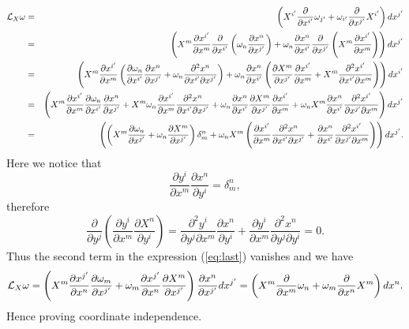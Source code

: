 \begin{eqnarray}
{\mathcal{L}}_{X} \omega &=& \left( X^{i'} \frac{\partial}{\partial x^{i'}}\omega_{j'} + \omega_{i'} \frac{\partial}{\partial x^{j'}}{X}^{i'} \right)dx^{j'} \nonumber \\
&=&\left(X^m\frac{\partial x^{i'}}{\partial x^m} \frac{\partial}{\partial x^{i'}}\left(\omega_n\frac{\partial x^n}{\partial x^{j'}}\right) + \omega_n\frac{\partial x^n}{\partial x^{i'}}\frac{\partial}{\partial x^{j'}}\left(X^m \frac{\partial x^{i'}}{\partial x^m}\right)\right)d x^{j'} \nonumber \\
&=& \left(X^m\frac{\partial x^{i'}}{\partial x^m}\left( \frac{\partial\omega_n}{\partial x^{i'}}\frac{\partial x^n}{\partial x^{j'}}+\omega_n\frac{\partial^2 x^n}{\partial x^{i'}\partial x^{j'}}\right) + \omega_n \frac{\partial x^n}{\partial x^{i'}}\left(\frac{\partial X^m}{\partial x^{j'}}\frac{\partial x^{i'}}{\partial x^m}+X^m\frac{\partial^2 x^{i'}}{\partial x^{i'} \partial x^m} \right) \right)d x^{i'} \nonumber \\
&=&\left(X^m\frac{\partial x^{i'}}{\partial x^m}\frac{\partial\omega_n}{\partial x^{i'}}\frac{\partial x^n}{\partial x^{j'}}+X^m\omega_n\frac{\partial x^{i'}}{\partial x^m}\frac{\partial^2 x^n}{\partial x^{i'}\partial x^{j'}}+\omega_n\frac{\partial x^n}{\partial x^{i'}}\frac{\partial X^m}{\partial x^{j'}}\frac{\partial x^{i'}}{\partial x^m}+\omega_n X^m\frac{\partial x^n}{\partial x^{i'}}\frac{\partial^2 x^{i'}}{\partial x^{j'} \partial x^m} \right)d x^{j'}\nonumber \\
&=&\left(\left(X^m\frac{\partial\omega_n}{\partial x^{j'}}+\omega_n\frac{\partial X^m}{\partial x^{j'}}\right)\delta_{m}^{n}+\omega_n X^m\left(\frac{\partial x^{i'}}{\partial x^m}\frac{\partial^2 x^n}{\partial x^{i'}\partial x^{j'}}+\frac{\partial x^n}{\partial x^{i'}}\frac{\partial^2 x^{i'}}{\partial x^{j'} \partial x^m}\right)\right)d x^{j'}. \label{eq:last}
\end{eqnarray}
Here we notice that
 \[ \frac{\partial y^i}{\partial x^m}\frac{\partial x^n}{\partial y^i}=\delta_{m}^{n}, \]
therefore
\[\frac{\partial}{\partial y^j}\left(\frac{\partial y^i}{\partial x^m}\frac{\partial X^n}{\partial y^i}\right)=\frac{\partial^2 y^i}{\partial y^j\partial x^m}\frac{\partial x^n}{\partial y^i} + \frac{\partial y^i}{\partial x^m}\frac{\partial^2 x^n}{\partial y^j \partial y^i}=0.\]
Thus the second term in the expression (\ref{eq:last}) vanishes and we have
\[{\mathcal{L}}_X \omega =\left(X^m\frac{\partial x^{j'}}{\partial x^n}\frac{\partial\omega_m}{\partial x^{j'}}+\omega_m\frac{\partial x^{j'}}{\partial x^n}\frac{\partial X^m}{\partial x^{j'}}\right)\frac{\partial x^n}{\partial x^{j'}}d x^{j'} = \left(X^m\frac{\partial}{\partial x^m}\omega_n + \omega_m\frac{\partial}{\partial x^n}X^m\right)dx^n. \]
Hence proving coordinate independence.\\

